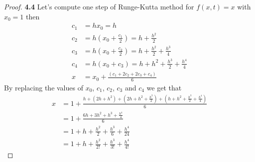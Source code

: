 \documentclass[11pt]{article}
\begin{document}
    \begin{proof}{\textbf{4.4}}
        Let's compute one step of Runge-Kutta method for $f(x,t) = x$ with
        $x_0=1$ then
        \begin{align*}
            c_1 &= hx_0 = h\\
            c_2 &= h(x_0 + \frac{c_1}{2}) = h + \frac{h^2}{2} \\
            c_3 &= h(x_0 + \frac{c_2}{2}) = h + \frac{h^2}{2} + \frac{h^3}{4} \\
            c_4 &= h(x_0 + c_3) = h + h^2 + \frac{h^3}{2} + \frac{h^4}{4}\\
            x &= x_0 + \frac{(c_1 + 2c_2 + 2c_3 + c_4)}{6}
        \end{align*}
        By replacing the values of $x_0$, $c_1$, $c_2$, $c_3$ and $c_4$ we get that
        \begin{align*}
            x &= 1 + \frac{h + (2h + h^2) + (2h + h^2 + \frac{h^3}{2}) + (h + h^2 + \frac{h^3}{2} + \frac{h^4}{4})}{6} \\
              &= 1 + \frac{6h + 3h^2 + h^3 + \frac{h^4}{4}}{6} \\
              &= 1 + h + \frac{h^2}{2} + \frac{h^3}{6} + \frac{h^4}{24} \\
              &= 1 + h + \frac{h^2}{2!} + \frac{h^3}{3!} + \frac{h^4}{4!}
        \end{align*}
    \end{proof}
\cleardoublepage
\end{document}
